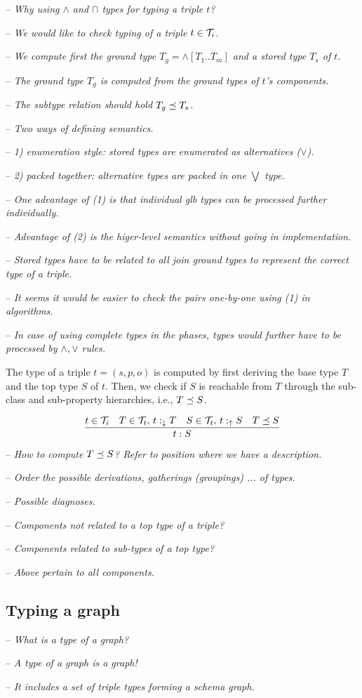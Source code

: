 \documentclass[runningheads]{llncs}
\newcommand{\darr}{\downarrow}
\newcommand{\uarr}{\uparrow}
\newcommand{\T}{{\cal T}}
\newcommand{\notes}[1]{\noindent\begin{small}-- \emph{#1}\\\end{small}}
\newcommand{\nnotes}[1]{\indent\begin{small}-- \emph{#1}\\\end{small}}
\begin{document}
\notes{Why using $\land$ and $\sqcap$ types for typing a triple $t$?}
\nnotes{We would like to check typing of a triple $t\in\T_i$.}
\nnotes{We compute first the ground type $T_g=\land[T_1..T_m]$ and a stored type $T_s$ of $t$.}
\nnotes{The ground type $T_g$ is computed from the ground types of $t$'s components.}
\nnotes{The subtype relation should hold $T_g\preceq\/T_s$.}

\notes{Two ways of defining semantics.}
\notes{1) enumeration style: stored types are enumerated as alternatives ($\lor$).}
\notes{2) packed together: alternative types are packed in one $\bigvee$ type.}
\notes{One advantage of (1) is that individual glb types can be processed further individually.}
\notes{Advantage of (2) is the higer-level semantics without going in implementation.}

\notes{Stored types have to be related to all join ground types to represent the correct type of a triple.}
\notes{It seems it would be easier to check the pairs one-by-one using (1) in algorithms.}
\notes{In case of using complete types in the phases, types would further have to be processed by $\land,\lor$ rules.}

The type of a triple $t=(s,p,o)$ is computed by first deriving the
base type $T$ and the top type $S$ of $t$. Then, we check if $S$ is
reachable from $T$ through the sub-class and sub-property hierarchies,
i.e., $T\preceq\/S$.

\begin{equation}
\dfrac{t\in\T_i\quad T\in\T_t,\, t:_{\darr}T\quad S\in\T_t,\, t:_\uarr\/S\quad T\preceq\/S}
      {t:S}
\end{equation}

\medskip

\medskip
\notes{How to compute $T\preceq\/S$? Refer to position where we have a description.}
\notes{Order the possible derivations, gatherings (groupings) ... of types.}

\notes{Possible diagnoses.}
\notes{Components not related to a top type of a triple?}
\notes{Components related to sub-types of a top type?}
\notes{Above pertain to all components.}




\subsection{Typing a graph}

\notes{What is a type of a graph?}
\nnotes{A type of a graph is a graph!}
\nnotes{It includes a set of triple types forming a schema graph.}
\end{document}

